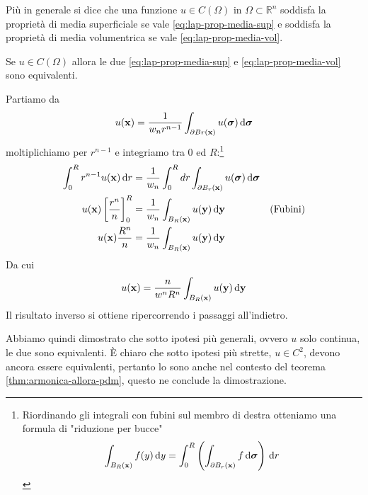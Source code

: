 \begin{definition}[PDM]
    Più in generale si dice che una funzione $u\in C(\Omega)$ in $\Omega \subset \mathbb{R}^{n}$ soddisfa la proprietà di media superficiale se vale \eqref{eq:lap-prop-media-sup} e soddisfa la proprietà di media volumentrica se vale \eqref{eq:lap-prop-media-vol}.
\end{definition}
\begin{theorem}
    Se $u\in C(\Omega)$ allora le due \eqref{eq:lap-prop-media-sup} e \eqref{eq:lap-prop-media-vol} sono equivalenti.
\end{theorem}
\begin{dimostrazione}
    Partiamo da
    \begin{equation*}
        u(\mathbf{x}) =\frac{1}{w_{n} r^{n-1}}\int _{\partial Br(\mathbf{x})} u(\bm{\sigma}) \,\mathrm d \bm{\sigma}
    \end{equation*}
    moltiplichiamo per $r^{n-1}$ e integriamo tra $0$ ed $R$:\footnote{Riordinando gli integrali con fubini sul membro di destra otteniamo una formula di "riduzione per bucce"
        \begin{equation*}
            \int _{B_{R}(\mathbf{x})} f(y) \,\mathrm d y=\int _{0}^{R}\left(\int _{\partial B_{r}(\mathbf{x})} f\,\mathrm d \bm{\sigma} \right) \,\mathrm d r
        \end{equation*}
    }
    \begin{align*}
        \int _{0}^{R} r^{n-1} u(\mathbf{x}) \,\mathrm d r           & =\frac{1}{w_{n}}\int _{0}^{R} dr\int _{\partial B_{r}(\mathbf{x})} u(\bm{\sigma}) \,\mathrm d \bm{\sigma} &                 \\
        u(\mathbf{x})\left[\frac{r^{n}}{n}\right]_{0}^{R} & =\frac{1}{w_{n}}\int _{B_{R}(\mathbf{x})} u(\mathbf{y}) \,\mathrm d \mathbf{y}                              & \text{(Fubini)} \\
        u(\mathbf{x})\frac{R^{n}}{n}                      & =\frac{1}{w_{n}}\int _{B_{R}(\mathbf{x})} u(\mathbf{y}) \,\mathrm d \mathbf{y}                              &
    \end{align*}
    Da cui
    \begin{equation*}
        u(\mathbf{x}) =\frac{n}{w^{n} R^{n}}\int _{B_{R}(\mathbf{x})} u(\mathbf{y}) \,\mathrm d \mathbf{y}
    \end{equation*}
    Il risultato inverso si ottiene ripercorrendo i passaggi all'indietro.
\end{dimostrazione}
Abbiamo quindi dimostrato che sotto ipotesi più generali, ovvero $u$ solo continua, le due sono equivalenti. È chiaro che sotto ipotesi più strette, $u\in C^{2}$, devono ancora essere equivalenti, pertanto lo sono anche nel contesto del teorema \ref{thm:armonica-allora-pdm}, questo ne conclude la dimostrazione.

